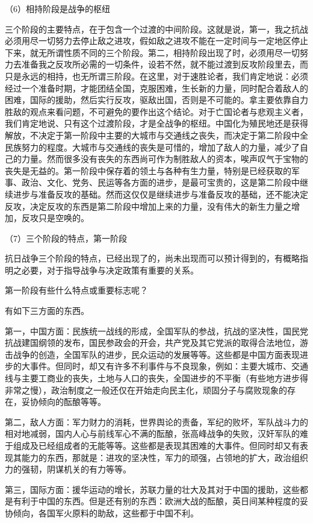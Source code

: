 \documentclass[UTF8, 12pt, a4paper]{ctexrep}
\begin{document}
（6）相持阶段是战争的枢纽

三个阶段的主要特点，在于包含一个过渡的中间阶段。这就是说，第一，我之抗战必须用尽一切努力去停止敌之进攻，假如敌之进攻不能在一定时间与一定地区停止下来，就无所谓性质不同的三个阶段。第二，相持阶段出现了时，必须用尽一切努力去准备我之反攻所必需的一切条件，设若不然，就不能过渡到反攻阶段里去，而只是永远的相持，也无所谓三阶段。在这里，对于速胜论者，我们肯定地说：必须经过一个准备时期，才能团结全国，克服困难，生长新的力量，同时配合着敌人的困难，国际的援助，然后实行反攻，驱敌出国，否则是不可能的。拿主要依靠自力胜敌的观点来看问题，不可避免的要作出这个结论。对于亡国论者与悲观主义者，我们肯定地说、只有这个过渡阶段，才是全战争的枢纽。中国化为殖民地还是获得解放，不决定于第一阶段中主要的大城市与交通线之丧失，而决定于第二阶段中全民族努力的程度。大城市与交通线的丧失是可惜的，增加了敌人的力量，减少了自己的力量。然而很多没有丧失的东西尚可作为制胜敌人的资本，唉声叹气于宝物的丧失是无益的。第一阶段中保存着的领土与各种有生力量，特别是已经获取的军事、政治、文化、党务、民运等各方面的进步，是最可宝贵的，这是第二阶段中继续进步与准备反攻的基础。然而这仅仅是继续进步与准备反攻的基础，还不能决定反攻，决定反攻的东西是第二阶段中增加上来的力量，没有伟大的新生力量之增加，反攻只是空唤的。

（7）三个阶段的特点，第一阶段

抗日战争三个阶段的特点，已经出现了的，尚未出现而可以预计得到的，有概略指明之必要，对于指导战争与决定政策有重要的关系。

第一阶段有些什么特点或重要标志呢？

有如下三方面的东西。

第一，中国方面：民族统一战线的形成，全国军队的参战，抗战的坚决性，国民党抗战建国纲领的发布，国民参政会的开会，共产党及其它党派的取得合法地位，游击战争的创造，全国军队的进步，民众运动的发展等等。这些都是中国方面表现进步的大事件。但同时，却又有许多不利事件与不良现象，例如：主要大城市、交通线与主要工商业的丧失，土地与人口的丧失，全国进步的不平衡（有些地方进步得非常之慢），政治制度之一般还仅在开始走向民主化，顽固分子与腐败现象的存在，妥协倾向的酝酿等等。

第二，敌人方面：军力财力的消耗，世界舆论的责备，军纪的败坏，军队战斗力的相对地减弱，国内人心与前线军心不满的酝酿，张高峰战争的失败，汉奸军队的难于组成及已经组成者的无能等等。这些都是表现其困难的大事件。但同时却又有表现其能力的东西，那就是：进攻的坚决性，军力的顽强，占领地的扩大，政治组织力的强韧，阴谋机关的有力等等。

第三，国际方面：援华运动的增长，苏联力量的壮大及其对于中国的援助，这些都是有利于中国的东西。但是还有别的东西：欧洲大战的酝酿，英日间某种程度的妥协倾向，各国军火原料的助敌，这些都于中国不利。
\end{document}
